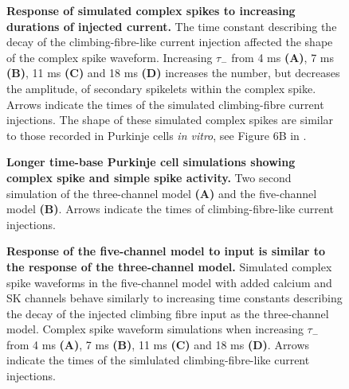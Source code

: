 \documentclass[utf8]{frontiersSCNS} %
\begin{document}
\begin{figure}[!ht]
\caption{\textbf {Response of simulated complex spikes to increasing
    durations of injected current.} The time constant describing the
  decay of the climbing-fibre-like current injection affected the
  shape of the complex spike waveform. Increasing $\tau_-$ from 4 ms
  \textbf{(A)}, 7 ms \textbf{(B)}, 11 ms \textbf{(C)} and 18 ms
  \textbf{(D)} increases the number, but decreases the amplitude, of
  secondary spikelets within the complex spike. Arrows indicate the times
  of the simulated climbing-fibre current injections. The shape of
  these simulated complex spikes are similar to those recorded in
  Purkinje cells \textit{in vitro}, see Figure 6B in
  \protect\cite{MonsivaisEtAl2005}.
\label{fig:injection_durations}}
\end{figure}



\begin{figure}[!ht]
\caption{\textbf{Longer time-base Purkinje cell simulations showing
    complex spike and simple spike activity.} Two second simulation of
  the three-channel model \textbf{(A)} and the five-channel model
    \textbf{(B)}. Arrows indicate the times of climbing-fibre-like
    current injections.}
\label{fig:long_time_base}
\end{figure}


\begin{figure}[!ht]
\caption{\textbf{Response of the five-channel model to input is similar
    to the response of the three-channel model.} Simulated complex
  spike waveforms in the five-channel model with added calcium and SK
  channels behave similarly to increasing time constants describing the decay of the
  injected climbing fibre input as the three-channel model. Complex spike waveform simulations when increasing $\tau_-$ from 4 ms
  \textbf{(A)}, 7 ms \textbf{(B)}, 11 ms \textbf{(C)} and 18 ms
  \textbf{(D)}. Arrows indicate the times
  of the simlulated climbing-fibre-like current injections.}
\label{S2_Fig}
\end{figure}
\end{document}
